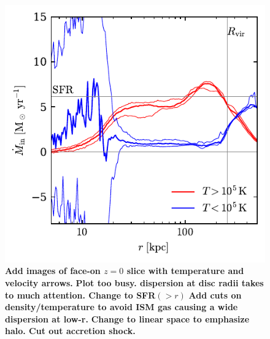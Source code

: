 \documentclass[fleqn,usenatbib]{mnras}
\begin{document}
\begin{figure}
    \centering
    \includegraphics{Mdot_m12i.pdf}
    \caption{
    \textbf{Add images of face-on $z=0$ slice with temperature and velocity arrows.}
    \textbf{Plot too busy. dispersion at disc radii takes to much attention. Change to SFR$(>r)$}
    \textbf{Add cuts on density/temperature to avoid ISM gas causing a wide dispersion at low-r.}
    \textbf{Change to linear space to emphasize halo. Cut out accretion shock.}
    }
    \label{f:Mdot}
\end{figure}
\end{document}
